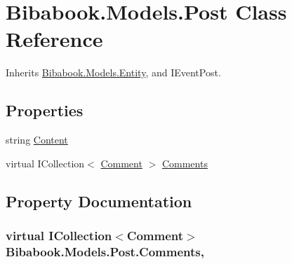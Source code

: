 \hypertarget{class_bibabook_1_1_models_1_1_post}{}\section{Bibabook.\+Models.\+Post Class Reference}
\label{class_bibabook_1_1_models_1_1_post}


Inherits \hyperlink{class_bibabook_1_1_models_1_1_entity}{Bibabook.\+Models.\+Entity}, and I\+Event\+Post.

\subsection*{Properties}
\begin{DoxyCompactItemize}
\item 
string \hyperlink{class_bibabook_1_1_models_1_1_post_a9c15b7975ca6607251461110097aa280}{Content}
\item 
virtual I\+Collection$<$ \hyperlink{class_bibabook_1_1_models_1_1_comment}{Comment} $>$ \hyperlink{class_bibabook_1_1_models_1_1_post_a95da5c00e529f243e14078679b552c93}{Comments}
\end{DoxyCompactItemize}


\subsection{Property Documentation}
\hypertarget{class_bibabook_1_1_models_1_1_post_a95da5c00e529f243e14078679b552c93}{}
\subsubsection[{Comments}]{\setlength{\rightskip}{0pt plus 5cm}virtual I\+Collection$<${\bf Comment}$>$ Bibabook.\+Models.\+Post.\+Comments\hspace{0.3cm}{\ttfamily [get]}, {\ttfamily [set]}}\label{class_bibabook_1_1_models_1_1_post_a95da5c00e529f243e14078679b552c93}
\hypertarget{class_bibabook_1_1_models_1_1_post_a9c15b7975ca6607251461110097aa280}{}
